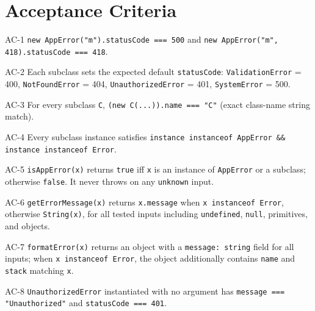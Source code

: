 \section{Acceptance Criteria}

\begin{ac}{AC-1}
\texttt{new AppError("m").statusCode === 500} and \texttt{new AppError("m", 418).statusCode === 418}.
\end{ac}

\begin{ac}{AC-2}
Each subclass sets the expected default \texttt{statusCode}: \texttt{ValidationError} = 400, \texttt{NotFoundError} = 404, \texttt{UnauthorizedError} = 401, \texttt{SystemError} = 500.
\end{ac}

\begin{ac}{AC-3}
For every subclass \texttt{C}, \texttt{(new C(...)).name === "C"} (exact class-name string match).
\end{ac}

\begin{ac}{AC-4}
Every subclass instance satisfies \texttt{instance instanceof AppError \&\& instance instanceof Error}.
\end{ac}

\begin{ac}{AC-5}
\texttt{isAppError(x)} returns \texttt{true} iff \texttt{x} is an instance of \texttt{AppError} or a subclass; otherwise \texttt{false}. It never throws on any \texttt{unknown} input.
\end{ac}

\begin{ac}{AC-6}
\texttt{getErrorMessage(x)} returns \texttt{x.message} when \texttt{x instanceof Error}, otherwise \texttt{String(x)}, for all tested inputs including \texttt{undefined}, \texttt{null}, primitives, and objects.
\end{ac}

\begin{ac}{AC-7}
\texttt{formatError(x)} returns an object with a \texttt{message: string} field for all inputs; when \texttt{x instanceof Error}, the object additionally contains \texttt{name} and \texttt{stack} matching \texttt{x}.
\end{ac}

\begin{ac}{AC-8}
\texttt{UnauthorizedError} instantiated with no argument has \texttt{message === "Unauthorized"} and \texttt{statusCode === 401}.
\end{ac}

